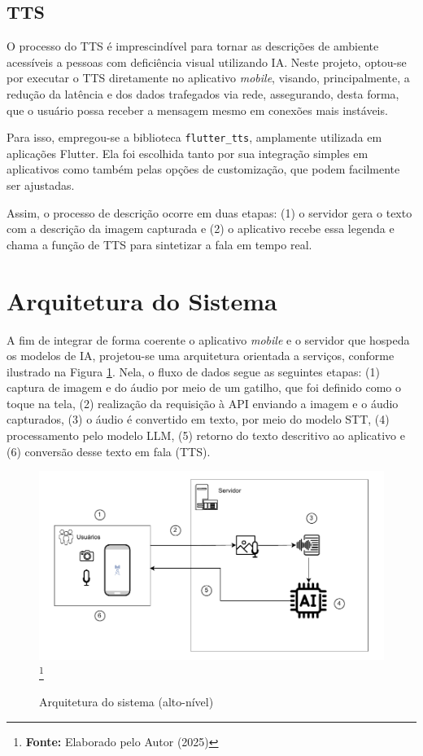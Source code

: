 \subsection{TTS}

O processo do TTS é imprescindível para tornar as descrições de ambiente acessíveis a pessoas com deficiência visual utilizando IA. Neste projeto, optou-se por executar o TTS diretamente no aplicativo \textit{mobile}, visando, principalmente, a redução da latência e dos dados trafegados via rede, assegurando, desta forma, que o usuário possa receber a mensagem mesmo em conexões mais instáveis.

Para isso, empregou-se a biblioteca \texttt{flutter\_tts}, amplamente utilizada em aplicações Flutter. Ela foi escolhida tanto por sua integração simples em aplicativos como também pelas opções de customização, que podem facilmente ser ajustadas. 

Assim, o processo de descrição ocorre em duas etapas: (1) o servidor gera o texto com a descrição da imagem capturada e (2) o aplicativo recebe essa legenda e chama a função de TTS para sintetizar a fala em tempo real.

\section{Arquitetura do Sistema}

A fim de integrar de forma coerente o aplicativo \textit{mobile} e o servidor que hospeda os modelos de IA, projetou-se uma arquitetura orientada a serviços, conforme ilustrado na Figura \ref{fig:6}. Nela, o fluxo de dados segue as seguintes etapas: (1) captura de imagem e do áudio por meio de um gatilho, que foi definido como o toque na tela, (2) realização da requisição à API enviando a imagem e o áudio capturados, (3) o áudio é convertido em texto, por meio do modelo STT, (4) processamento pelo modelo LLM, (5) retorno do texto descritivo ao aplicativo e (6) conversão desse texto em fala (TTS).

\begin{figure}[!ht]
     \caption{Arquitetura do sistema (alto-nível)}
     \centering
     \includegraphics[width=0.7\linewidth]{imagens/architeture-tcc.drawio.pdf}
     \label{fig:6}
     \footnote{\textbf{Fonte:} Elaborado pelo Autor (2025)}
\end{figure}

